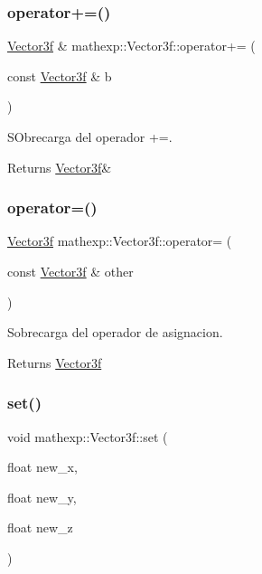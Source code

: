 \subsubsection{\texorpdfstring{operator+=()}{operator+=()}}
{\footnotesize\ttfamily \mbox{\hyperlink{structmathexp_1_1_vector3f}{Vector3f}} \& mathexp\+::\+Vector3f\+::operator+= (\begin{DoxyParamCaption}\item[{const \mbox{\hyperlink{structmathexp_1_1_vector3f}{Vector3f}} \&}]{b }\end{DoxyParamCaption})}



S\+Obrecarga del operador +=. 

\begin{DoxyReturn}{Returns}
\mbox{\hyperlink{structmathexp_1_1_vector3f}{Vector3f}}\& 
\end{DoxyReturn}
\mbox{\label{structmathexp_1_1_vector3f_a91fda351da88f23356789b42d62211e7}} 
\subsubsection{\texorpdfstring{operator=()}{operator=()}}
{\footnotesize\ttfamily \mbox{\hyperlink{structmathexp_1_1_vector3f}{Vector3f}} mathexp\+::\+Vector3f\+::operator= (\begin{DoxyParamCaption}\item[{const \mbox{\hyperlink{structmathexp_1_1_vector3f}{Vector3f}} \&}]{other }\end{DoxyParamCaption})}



Sobrecarga del operador de asignacion. 

\begin{DoxyReturn}{Returns}
\mbox{\hyperlink{structmathexp_1_1_vector3f}{Vector3f}} 
\end{DoxyReturn}
\mbox{\label{structmathexp_1_1_vector3f_a38da84d6630cf7c31d32f1272d438b91}} 
\subsubsection{\texorpdfstring{set()}{set()}}
{\footnotesize\ttfamily void mathexp\+::\+Vector3f\+::set (\begin{DoxyParamCaption}\item[{float}]{new\+\_\+x,  }\item[{float}]{new\+\_\+y,  }\item[{float}]{new\+\_\+z }\end{DoxyParamCaption})}




